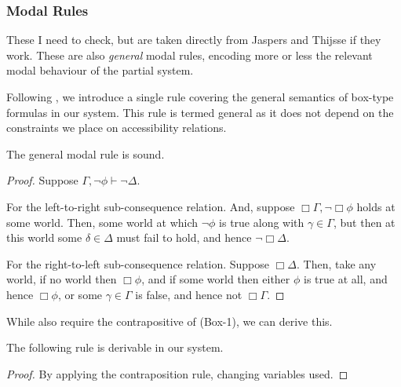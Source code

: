 \documentclass[10pt]{article}
\newcommand{\seq}{\ensuremath{>\!\!\!-}}
\begin{document}
\subsubsection{Modal Rules}
\label{sec:modal-rules}

These I need to check, but are taken directly from Jaspers and Thijsse if they work.
These are also \emph{general} modal rules, encoding more or less the relevant modal behaviour of the partial system.

Following \citeauthor{Jaspars:1996aa}, we introduce a single rule covering the general semantics of box-type formulas in our system.
This rule is termed general as it does not depend on the constraints we place on accessibility relations.


\begin{lemma}[Soundness]
  The general modal rule is sound.
  \begin{proof}
    Suppose \(\Gamma,\lnot\phi \vdash \lnot\Delta\).

    For the left-to-right sub-consequence relation. And, suppose \(\Box\Gamma, \lnot\Box\phi\) holds at some world. Then, some world at which \(\lnot\phi\) is true along with \(\gamma \in \Gamma\), but then at this world some \(\delta \in \Delta\) must fail to hold, and hence \(\lnot\Box\Delta\).

    For the right-to-left sub-consequence relation. Suppose \(\Box\Delta\). Then, take any world, if no world then \(\Box\phi\), and if some world then either \(\phi\) is true at all, and hence \(\Box\phi\), or some \(\gamma \in \Gamma\) is false, and hence not \(\Box\Gamma\).
  \end{proof}
\end{lemma}

While \citeauthor{Jaspars:1996aa} also require the contrapositive of (Box-1), we can derive this.

\begin{proposition}
  The following rule is derivable in our system.
  \begin{proof}
    By applying the contraposition rule, changing variables used.
  \end{proof}
\end{proposition}
\end{document}
